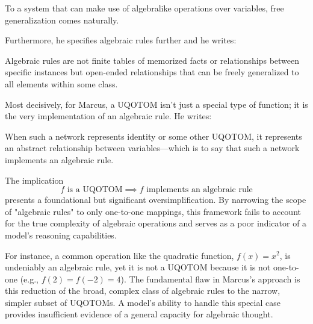 \documentclass[../../main.tex]{subfiles}
\begin{document}
\begin{citecallout}
    To a system that can make use of algebralike operations over variables,
    free generalization comes naturally.
\end{citecallout}

Furthermore, he specifies algebraic rules further and he writes:

\begin{citecallout}
    Algebraic rules are not finite tables of memorized facts or relationships between specific instances but open-ended relationships that can be freely generalized to all elements within some class.
\end{citecallout}

Most decisively, for Marcus, a UQOTOM isn't just a special type of function; it is the very implementation of an algebraic rule. He writes:

\begin{citecallout}
    \begin{premise}
        \label{premise:uqotom_algebraic_rule}
        When such a network represents identity or some other UQOTOM,
        it represents an abstract relationship between variables—which is to say
        that such a network implements an algebraic rule.
    \end{premise}
\end{citecallout}

\begin{critique}
    The implication
    \[
        f \text{ is a UQOTOM} \implies f \text{ implements an algebraic rule}
    \]
    presents a foundational but significant oversimplification. By narrowing the scope of "algebraic rules" to only one-to-one mappings, this framework fails to account for the true complexity of algebraic operations and serves as a poor indicator of a model's reasoning capabilities.

    For instance, a common operation like the quadratic function, $f(x) = x^2$, is undeniably an algebraic rule, yet it is not a UQOTOM because it is not one-to-one (e.g., $f(2) = f(-2) = 4$). The fundamental flaw in Marcus's approach is this reduction of the broad, complex class of algebraic rules to the narrow, simpler subset of UQOTOMs. A model's ability to handle this special case provides insufficient evidence of a general capacity for algebraic thought.
\end{critique}
\end{document}
